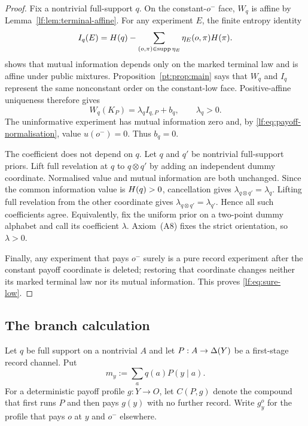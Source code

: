 \begin{proof}
Fix a nontrivial full-support $q$.  On the constant-$o^-$ face, $W_q$ is
affine by Lemma~\ref{lf:lem:terminal-affine}.  For any experiment $E$, the
finite entropy identity
\begin{equation}
I_q(E)=H(q)-\sum_{(o,\pi)\in\operatorname{supp}\eta_E}
\eta_E(o,\pi)H(\pi).
\label{lf:eq:posterior-entropy}
\end{equation}
shows that mutual information depends only on the marked terminal law and is
affine under public mixtures.  Proposition~\ref{pt:prop:main} says that $W_q$ and
$I_q$ represent the same nonconstant order on the constant-low face.
Positive-affine uniqueness therefore gives
\[
W_q(K_P)=\lambda_q I_{q,P}+b_q,
\qquad \lambda_q>0.
\]
The uninformative experiment has mutual information zero and, by
\eqref{lf:eq:payoff-normalisation}, value $u(o^-)=0$.  Thus $b_q=0$.

The coefficient does not depend on $q$.  Let $q$ and $q'$ be nontrivial
full-support priors.  Lift full revelation at $q$ to $q\otimes q'$ by adding an
independent dummy coordinate.  Normalised value and mutual information are both
unchanged.  Since the common information value is $H(q)>0$, cancellation
gives $\lambda_{q\otimes q'}=\lambda_q$.  Lifting full revelation from the
other coordinate gives $\lambda_{q\otimes q'}=\lambda_{q'}$.  Hence all such
coefficients agree.  Equivalently, fix the uniform prior on a two-point dummy
alphabet and call its coefficient $\lambda$.  Axiom~\textup{(A8)} fixes the
strict orientation, so $\lambda>0$.

Finally, any experiment that pays $o^-$ surely is a pure record experiment
after the constant payoff coordinate is deleted; restoring that coordinate
changes neither its marked terminal law nor its mutual information.  This
proves \eqref{lf:eq:sure-low}.
\end{proof}

\subsection{The branch calculation}

Let $q$ be full support on a nontrivial $A$ and let
$P:A\to\Delta(Y)$ be a first-stage record channel.  Put
\[
m_y:=\sum_a q(a)P(y\mid a).
\]
For a deterministic payoff profile $g:Y\to O$, let $C(P,g)$ denote the
compound that first runs $P$ and then pays $g(y)$ with no further record.
Write $g_y^o$ for the profile that pays $o$ at $y$ and $o^-$ elsewhere.

